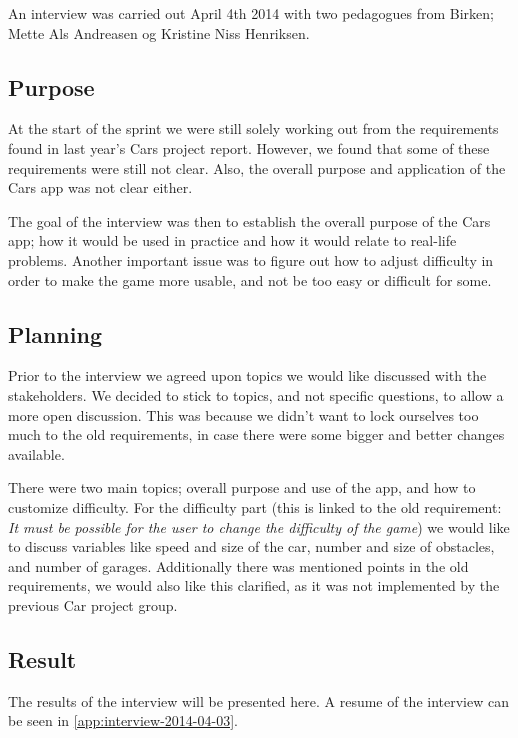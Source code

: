 An interview was carried out April 4th 2014 with two pedagogues from Birken; Mette Als Andreasen og Kristine Niss Henriksen.

\subsection{Purpose}
At the start of the sprint we were still solely working out from the requirements found in last year's Cars project report.
However, we found that some of these requirements were still not clear.
Also, the overall purpose and application of the Cars app was not clear either.

The goal of the interview was then to establish the overall purpose of the Cars app; how it would be used in practice and how it would relate to real-life problems.
Another important issue was to figure out how to adjust difficulty in order to make the game more usable, and not be too easy or difficult for some.

\subsection{Planning}
Prior to the interview we agreed upon topics we would like discussed with the stakeholders.
We decided to stick to topics, and not specific questions, to allow a more open discussion.
This was because we didn't want to lock ourselves too much to the old requirements, in case there were some bigger and better changes available.

There were two main topics; overall purpose and use of the app, and how to customize difficulty.
For the difficulty part (this is linked to the old requirement: \textit{It must be possible for the user to change the difficulty of the game}) we would like to discuss variables like speed and size of the car, number and size of obstacles, and number of garages.
Additionally there was mentioned points in the old requirements, we would also like this clarified, as it was not implemented by the previous Car project group.

\subsection{Result}
The results of the interview will be presented here.
A resume of the interview can be seen in \ref{app:interview-2014-04-03}.

